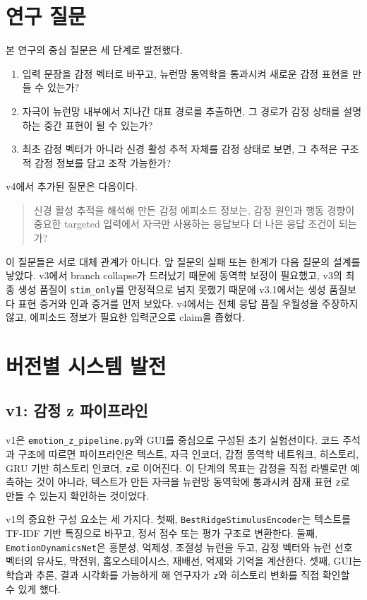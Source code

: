 \documentclass[11pt,a4paper]{article}
\newcommand{\eng}[1]{\texttt{#1}}
\begin{document}
\section{연구 질문}

본 연구의 중심 질문은 세 단계로 발전했다.

\begin{enumerate}
  \item 입력 문장을 감정 벡터로 바꾸고, 뉴런망 동역학을 통과시켜 새로운 감정 표현을 만들 수 있는가?
  \item 자극이 뉴런망 내부에서 지나간 대표 경로를 추출하면, 그 경로가 감정 상태를 설명하는 중간 표현이 될 수 있는가?
  \item 최초 감정 벡터가 아니라 신경 활성 추적 자체를 감정 상태로 보면, 그 추적은 구조적 감정 정보를 담고 조작 가능한가?
\end{enumerate}

v4에서 추가된 질문은 다음이다.

\begin{quote}
신경 활성 추적을 해석해 만든 감정 에피소드 정보는, 감정 원인과 행동 경향이 중요한 targeted 입력에서 자극만 사용하는 응답보다 더 나은 응답 조건이 되는가?
\end{quote}

이 질문들은 서로 대체 관계가 아니다. 앞 질문의 실패 또는 한계가 다음 질문의 설계를 낳았다. v3에서 branch collapse가 드러났기 때문에 동역학 보정이 필요했고, v3의 최종 생성 품질이 \eng{stim\_only}를 안정적으로 넘지 못했기 때문에 v3.1에서는 생성 품질보다 표현 증거와 인과 증거를 먼저 보았다. v4에서는 전체 응답 품질 우월성을 주장하지 않고, 에피소드 정보가 필요한 입력군으로 claim을 좁혔다.

\section{버전별 시스템 발전}

\subsection{v1: 감정 z 파이프라인}

v1은 \eng{emotion\_z\_pipeline.py}와 GUI를 중심으로 구성된 초기 실험선이다. 코드 주석과 구조에 따르면 파이프라인은 텍스트, 자극 인코더, 감정 동역학 네트워크, 히스토리, GRU 기반 히스토리 인코더, \eng{z}로 이어진다. 이 단계의 목표는 감정을 직접 라벨로만 예측하는 것이 아니라, 텍스트가 만든 자극을 뉴런망 동역학에 통과시켜 잠재 표현 \eng{z}로 만들 수 있는지 확인하는 것이었다.

v1의 중요한 구성 요소는 세 가지다. 첫째, \eng{BestRidgeStimulusEncoder}는 텍스트를 TF-IDF 기반 특징으로 바꾸고, 정서 점수 또는 평가 구조로 변환한다. 둘째, \eng{EmotionDynamicsNet}은 흥분성, 억제성, 조절성 뉴런을 두고, 감정 벡터와 뉴런 선호 벡터의 유사도, 막전위, 홈오스테이시스, 재배선, 억제와 기억을 계산한다. 셋째, GUI는 학습과 추론, 결과 시각화를 가능하게 해 연구자가 \eng{z}와 히스토리 변화를 직접 확인할 수 있게 했다.
\end{document}
